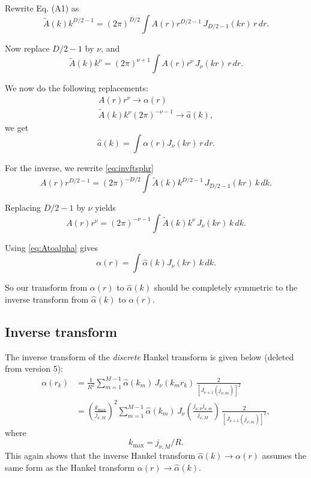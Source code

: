 \documentclass[preprint]{revtex4-1}
\numberwithin{equation}{subsection}
\numberwithin{table}{section}
\begin{document}
Rewrite Eq. (A1) as
\[
\tilde{A}(k) k^{D/2-1}
= (2 \pi)^{D/2}
\int A(r) r^{D/2-1} \, J_{D/2-1}(kr) \, r \, dr.
\]

Now replace $D/2 - 1$ by $\nu$, and
\[
\tilde{A}(k) k^\nu
= (2 \pi)^{\nu+1}
\int A(r) r^\nu \, J_{\nu}(kr) \, r \, dr.
\]

We now do the following replacements:
\begin{equation}
\begin{split}
  A(r) r^\nu \rightarrow \alpha(r) \\
  \tilde{A}(k) k^\nu (2\pi)^{-\nu-1}
  \rightarrow
  \hat a(k),
\end{split}
\label{eq:Atoalpha}
\end{equation}
we get
\[
\hat a(k)
=
\int \alpha(r) J_\nu(kr) \, r \, dr.
\]

For the inverse, we rewrite \eqref{eq:invftsphr}
\[
A(r) r^{D/2-1}
=
(2\pi)^{-D/2}
\int \tilde{A}(k) k^{D/2-1} \, J_{D/2-1}(kr) \, k \, dk.
\]

Replacing $D/2 - 1$ by $\nu$ yields
\[
A(r) r^\nu
=
(2\pi)^{-\nu-1}
\int \tilde{A}(k) k^\nu \, J_\nu(kr) \, k \, dk.
\]

Using \eqref{eq:Atoalpha} gives
\[
\alpha(r)
=
\int \hat \alpha(k) J_\nu(kr) \, k \, dk.
\]

So our transform from $\alpha(r)$ to $\hat\alpha(k)$
should be completely symmetric to the inverse transform
from $\hat\alpha(k)$ to $\alpha(r)$.



\subsection{Inverse transform}

The inverse transform of the \emph{discrete} Hankel transform
is given below (deleted from version 5):
\begin{align*}
  \alpha(r_k)
&=
  \frac{ 1 }{ R^2 }
  \sum_{m = 1}^{M - 1}
    \hat\alpha(k_m) \,
    J_\nu(k_m r_k) \,
    \frac{ 2 }
    { \left[
        J_{\nu+1}(j_{\nu,m})
      \right]^2 }
\\
&=
  \left(
    \frac{ k_{\max} }
         { j_{\nu, M} }
  \right)^2
  \sum_{m = 1}^{M - 1}
    \hat\alpha(k_m) \,
    J_\nu\left(
      \frac{ j_{\nu, k} j_{\nu, m} }
           { j_{\nu, M} }
    \right) \,
    \frac{ 2 }
    { \left[
        J_{\nu + 1}(j_{\nu, m})
      \right]^2 },
\end{align*}
where
\[
  k_{\max} = j_{\nu, M} / R.
\]
This again shows that the inverse Hankel transform
$\hat\alpha(k) \rightarrow \alpha(r)$
assumes the same form as the Hankel transform
$\alpha(r) \rightarrow \hat\alpha(k)$.
\end{document}
